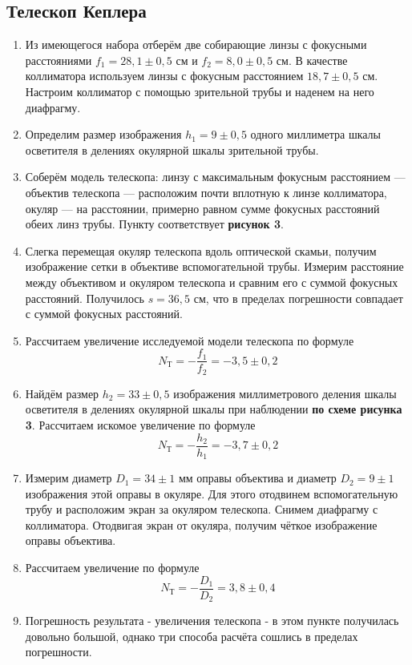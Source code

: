 \documentclass[a4paper,12pt]{article} %
\begin{document}
\subsection{Телескоп Кеплера}
\begin{enumerate}
    \item Из имеющегося набора отберём две собирающие линзы с фокусными расстояниями $f_{1} = 28,1 \pm 0,5$ см и $f_{2} = 8,0 \pm 0,5$ см. В качестве коллиматора используем линзы с фокусным расстоянием $18,7 \pm 0,5$ см. Настроим коллиматор с помощью зрительной трубы и наденем на него диафрагму.
    \item Определим размер изображения $h_{1} = 9 \pm 0,5$ одного миллиметра шкалы осветителя в делениях окулярной шкалы зрительной трубы.
    \item Соберём модель телескопа: линзу с максимальным фокусным расстоянием — объектив телескопа — расположим почти вплотную к линзе коллиматора, окуляр — на расстоянии, примерно равном сумме фокусных расстояний обеих линз трубы. Пункту соответствует \textbf{рисунок 3}.
    \item Слегка
перемещая окуляр телескопа вдоль оптической скамьи, получим изображение сетки в объективе вспомогательной трубы.
Измерим расстояние между объективом и окуляром телескопа и
сравним его с суммой фокусных расстояний. Получилось $s = 36,5$ см, что в пределах погрешности совпадает с суммой фокусных расстояний.
\item Рассчитаем увеличение исследуемой модели телескопа по формуле
\begin{equation}
    N_{\text{Т}} = -\frac{f_{1}}{f_{2}} = -3,5 \pm 0,2
\end{equation}
\item Найдём размер $h_{2} = 33 \pm 0,5$ изображения миллиметрового деления шкалы осветителя в делениях окулярной шкалы при наблюдении \textbf{по схеме рисунка 3}. Рассчитаем искомое увеличение по формуле
\begin{equation}
        N_{\text{Т}} = -\frac{h_{2}}{h_{1}} = -3,7 \pm 0,2
\end{equation}
\item Измерим диаметр $D_{1} = 34 \pm 1$ мм оправы объектива и диаметр $D_{2} = 9 \pm 1$  изображения этой оправы в окуляре. Для этого отодвинем вспомогательную трубу и расположим экран за окуляром телескопа. Снимем диафрагму с коллиматора. Отодвигая экран от окуляра, получим чёткое изображение оправы объектива.
\item Рассчитаем увеличение по формуле 
\begin{equation}
        N_{\text{Т}} = -\frac{D_{1}}{D_{2}} = 3,8 \pm 0,4
\end{equation}
\item Погрешность результата - увеличения телескопа - в этом пункте получилась довольно большой, однако три способа расчёта сошлись в пределах погрешности.
\end{enumerate}
\end{document}
